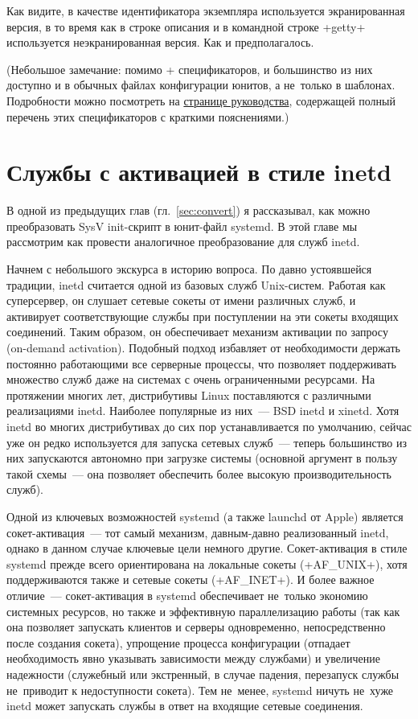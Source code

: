 \documentclass[10pt,oneside,a4paper]{article}
\begin{document}
Как видите, в качестве идентификатора экземпляра используется экранированная
версия, в то время как в строке описания и в командной строке +getty+
используется неэкранированная версия. Как и предполагалось.

(Небольшое замечание: помимо +%
спецификаторов, и большинство из них доступно и в обычных файлах конфигурации
юнитов, а не~только в шаблонах. Подробности можно посмотреть на
\href{http://0pointer.de/public/systemd-man/systemd.unit.html}{странице
руководства}, содержащей полный перечень этих спецификаторов с краткими
пояснениями.)

\section{Службы с активацией в стиле inetd}

В одной из предыдущих глав (гл.~\ref{sec:convert}) я рассказывал, как можно
преобразовать SysV init-скрипт в юнит-файл systemd. В этой главе мы рассмотрим
как провести аналогичное преобразование для служб inetd.

Начнем с небольшого экскурса в историю вопроса. По давно устоявшейся традиции,
inetd считается одной из базовых служб Unix-систем. Работая как суперсервер, он
слушает сетевые сокеты от имени различных служб, и активирует соответствующие
службы при поступлении на эти сокеты входящих соединений. Таким образом, он
обеспечивает механизм активации по запросу (on-demand activation). Подобный
подход избавляет от необходимости держать постоянно работающими все серверные
процессы, что позволяет поддерживать множество служб даже на системах с очень
ограниченными ресурсами. На протяжении многих лет, дистрибутивы Linux
поставляются с различными реализациями inetd. Наиболее популярные из них~--- BSD
inetd и xinetd. Хотя inetd во многих дистрибутивах до сих пор устанавливается по
умолчанию, сейчас уже он редко используется для запуска сетевых служб~--- теперь 
большинство из них запускаются автономно при загрузке системы (основной
аргумент в пользу такой схемы~--- она позволяет обеспечить более высокую
производительность служб).

Одной из ключевых возможностей systemd (а также launchd от Apple) является
сокет-активация~--- тот самый механизм, давным-давно реализованный inetd,
однако в данном случае ключевые цели немного другие. Сокет-активация в стиле
systemd прежде всего ориентирована на локальные сокеты (+AF_UNIX+), хотя
поддерживаются также и сетевые сокеты (+AF_INET+). И более важное отличие~---
сокет-активация в systemd обеспечивает не~только экономию системных ресурсов,
но также и эффективную параллелизацию работы (так как она
позволяет запускать клиентов и серверы одновременно, непосредственно после
создания сокета), упрощение процесса конфигурации (отпадает необходимость явно
указывать зависимости между службами) и увеличение надежности (служебный или
экстренный, в случае падения, перезапуск службы не~приводит к недоступности
сокета). Тем не~менее, systemd ничуть не~хуже inetd может запускать службы в
ответ на входящие сетевые соединения.
\end{document}
